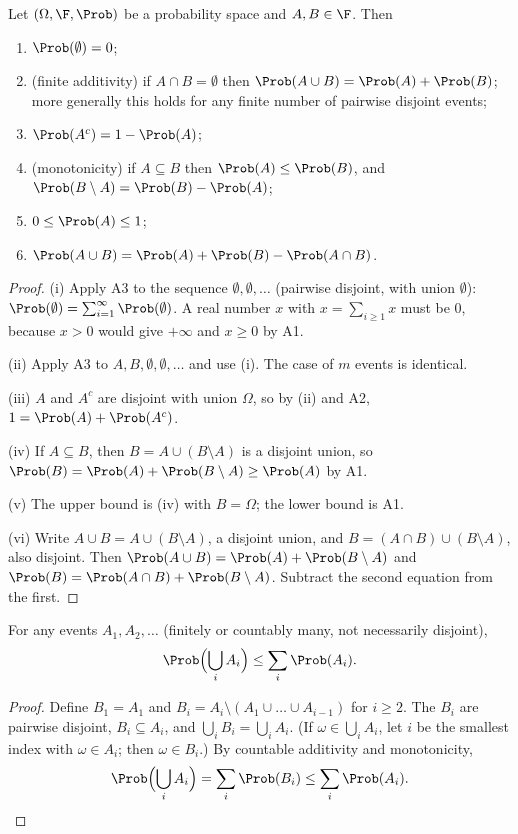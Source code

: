 \begin{proposition}\label{prop:basic}
Let $(\Omega,\F,\Prob)$ be a probability space and $A,B\in\F$. Then
\begin{enumerate}[label=(\roman*)]
\item $\Prob(\emptyset)=0$;
\item (finite additivity) if $A\cap B=\emptyset$ then
$\Prob(A\cup B)=\Prob(A)+\Prob(B)$; more generally this holds for any finite
number of pairwise disjoint events;
\item $\Prob(A^c)=1-\Prob(A)$;
\item (monotonicity) if $A\subseteq B$ then $\Prob(A)\le\Prob(B)$, and
$\Prob(B\setminus A)=\Prob(B)-\Prob(A)$;
\item $0\le\Prob(A)\le 1$;
\item $\Prob(A\cup B)=\Prob(A)+\Prob(B)-\Prob(A\cap B)$.
\end{enumerate}
\end{proposition}
\begin{proof}
(i) Apply A3 to the sequence $\emptyset,\emptyset,\dots$ (pairwise disjoint,
with union $\emptyset$): $\Prob(\emptyset)=\sum_{i=1}^\infty\Prob(\emptyset)$.
A real number $x$ with $x=\sum_{i\ge 1}x$ must be $0$, because $x>0$ would give
$+\infty$ and $x\ge0$ by A1.

(ii) Apply A3 to $A,B,\emptyset,\emptyset,\dots$ and use (i). The case of
$m$ events is identical.

(iii) $A$ and $A^c$ are disjoint with union $\Omega$, so by (ii) and A2,
$1=\Prob(A)+\Prob(A^c)$.

(iv) If $A\subseteq B$, then $B=A\cup(B\setminus A)$ is a disjoint union, so
$\Prob(B)=\Prob(A)+\Prob(B\setminus A)\ge\Prob(A)$ by A1.

(v) The upper bound is (iv) with $B=\Omega$; the lower bound is A1.

(vi) Write $A\cup B=A\cup(B\setminus A)$, a disjoint union, and
$B=(A\cap B)\cup(B\setminus A)$, also disjoint. Then
$\Prob(A\cup B)=\Prob(A)+\Prob(B\setminus A)$ and
$\Prob(B)=\Prob(A\cap B)+\Prob(B\setminus A)$. Subtract the second equation
from the first.
\end{proof}

\begin{theorem}\label{thm:boole}
For any events $A_1,A_2,\dots$ (finitely or countably many, not necessarily
disjoint),
\[
\Prob\Bigl(\bigcup_iA_i\Bigr)\le\sum_i\Prob(A_i).
\]
\end{theorem}
\begin{proof}
Define $B_1=A_1$ and $B_i=A_i\setminus(A_1\cup\dots\cup A_{i-1})$ for
$i\ge 2$. The $B_i$ are pairwise disjoint, $B_i\subseteq A_i$, and
$\bigcup_iB_i=\bigcup_iA_i$. (If $\omega\in\bigcup_iA_i$, let $i$ be the
smallest index with $\omega\in A_i$; then $\omega\in B_i$.) By countable
additivity and monotonicity,
\[
\Prob\Bigl(\bigcup_iA_i\Bigr)=\sum_i\Prob(B_i)\le\sum_i\Prob(A_i).\qedhere
\]
\end{proof}


